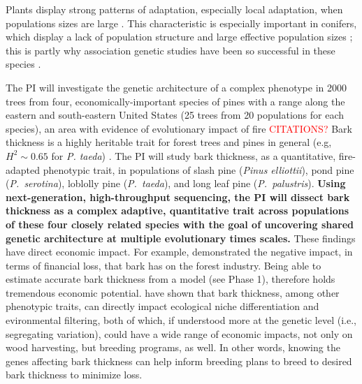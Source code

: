 Plants display strong patterns of adaptation, especially local adaptation, when populations sizes are large \citep{Leimu:2008fb}.
This characteristic is especially important in conifers, which display a lack of population structure and large effective population 
sizes \citep{Neale:2004hi}; this is partly why association genetic studies have been so successful in these species 
\citep{Eckert:2012cw,Eckert:2010hd, Wegrzyn:2010dd,Eckert:2009hh,GonzalezMartinez:2007gy,GonzalezMartinez:2006ij,Gupta:2005fx}.

The PI will investigate the genetic architecture of a complex phenotype in 2000 trees from four, economically-important 
species of pines with a range along the eastern and south-eastern United States (25 trees from 20 populations for each species), 
an area with evidence of evolutionary impact of fire \textcolor{red}{CITATIONS?}
Bark thickness is a highly heritable trait for forest trees and pines in general (e.g,  $H^2 \sim 0.65$ for \emph{P. taeda}) 
\citep{Pederick1970}.  The PI will study bark thickness, as a quantitative, fire-adapted phenotypic trait, in populations of slash 
pine (\emph{Pinus elliottii}), pond pine (\emph{P.\ serotina}), loblolly pine (\emph{P.\ taeda}), and long leaf pine 
(\emph{P.\ palustris}).  \textbf{Using next-generation, high-throughput sequencing, the PI will dissect bark thickness as a complex 
adaptive, quantitative trait across populations of these four closely related species with the goal of uncovering shared genetic 
architecture at multiple evolutionary times scales.}  These findings have direct economic impact.  For example, \citet{Marshall:2006wl} 
demonstrated the negative impact, in terms of financial loss, that bark has on the forest industry.  Being able to estimate accurate 
bark thickness from a model (see Phase 1), therefore holds tremendous economic potential.  \citet{Paine:2011cu} have shown that 
bark thickness, among other phenotypic traits, can directly impact ecological niche differentiation and evironmental filtering, both of 
which, if understood more at the genetic level (i.e., segregating variation), could have a wide range of economic impacts, not only on 
wood harvesting, but breeding programs, as well.  In other words, knowing the genes affecting bark thickness can help inform breeding 
plans to breed to desired bark thickness to minimize loss.


